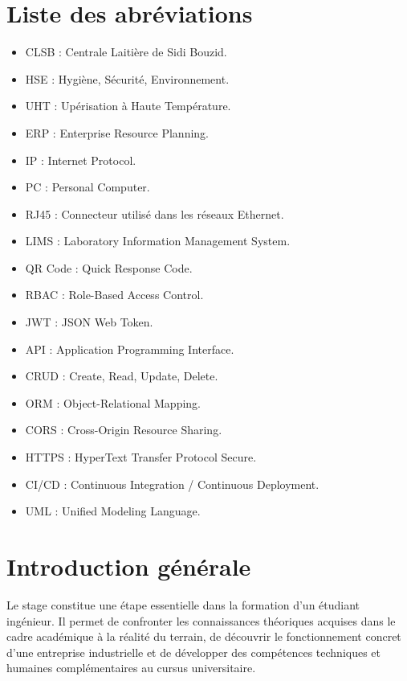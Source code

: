 \documentclass[12pt,a4paper,oneside]{report}
\begin{document}
\chapter*{Liste des abréviations}
\begin{itemize}[leftmargin=1.2cm]
\item CLSB : Centrale Laitière de Sidi Bouzid.
\item HSE : Hygiène, Sécurité, Environnement.
\item UHT : Upérisation à Haute Température.
\item ERP : Enterprise Resource Planning.
\item IP : Internet Protocol.
\item PC : Personal Computer.
\item RJ45 : Connecteur utilisé dans les réseaux Ethernet.
\item LIMS : Laboratory Information Management System.
\item QR Code : Quick Response Code.
\item RBAC : Role-Based Access Control.
\item JWT : JSON Web Token.
\item API : Application Programming Interface.
\item CRUD : Create, Read, Update, Delete.
\item ORM : Object-Relational Mapping.
\item CORS : Cross-Origin Resource Sharing.
\item HTTPS : HyperText Transfer Protocol Secure.
\item CI/CD : Continuous Integration / Continuous Deployment.
\item UML : Unified Modeling Language.
\end{itemize}
\clearpage
{}

\chapter*{Introduction générale}
Le stage constitue une étape essentielle dans la formation d'un étudiant ingénieur. Il permet de confronter les connaissances théoriques acquises dans le cadre académique à la réalité du terrain, de découvrir le fonctionnement concret d'une entreprise industrielle et de développer des compétences techniques et humaines complémentaires au cursus universitaire.
\end{document}
